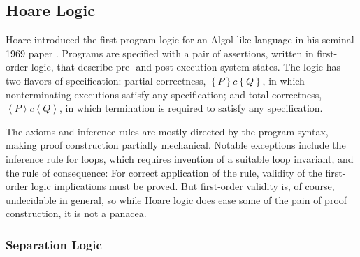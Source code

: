 \documentclass[11pt]{report}
\begin{document}
\subsection{Hoare Logic}

Hoare introduced the first program logic for an Algol-like language in his seminal 1969 paper \cite{DBLP:journals/cacm/Hoare69}. Programs are specified with a pair of assertions, written in first-order logic, that describe pre- and post-execution system states. The logic has two flavors of specification: partial correctness, $\left\lbrace P \right\rbrace c \left\lbrace Q \right\rbrace$, in which nonterminating executions satisfy any specification; and total correctness, $\left\langle P \right\rangle c \left\langle Q \right\rangle$, in which termination is required to satisfy any specification. 

The axioms and inference rules are mostly directed by the program syntax, making proof construction partially mechanical. Notable exceptions include the inference rule for loops, which requires invention of a suitable loop invariant, and the rule of consequence:  For correct application of the rule, validity of the first-order logic implications must be proved. But first-order validity is, of course, undecidable in general, so while Hoare logic does ease some of the pain of proof construction, it is not a panacea.


\subsubsection{Separation Logic}
\end{document}
